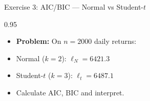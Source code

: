 \documentclass[9pt, aspectratio=169, t]{beamer}
\begin{document}
\begin{frame}{Exercise 3: AIC/BIC --- Normal vs Student-$t$}
\begin{cminipage}{0.95\textwidth}
    \begin{itemize}\setlength{\itemsep}{0pt}
        \item \textbf{Problem:} On $n = 2000$ daily returns:
    \end{itemize}
    \begin{itemize}\setlength{\itemsep}{0pt}
        \item Normal ($k=2$): $\ell_N = 6421.3$
        \item Student-$t$ ($k=3$): $\ell_t = 6487.1$
    \end{itemize}
    \begin{itemize}\setlength{\itemsep}{0pt}
        \item Calculate AIC, BIC and interpret.
    \end{itemize}
\end{cminipage}
\end{frame}
\end{document}
